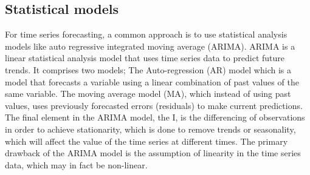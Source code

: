 \subsection{Statistical models}
For time series forecasting, a common approach is to use statistical analysis models like auto regressive integrated moving average (ARIMA).
ARIMA is a linear statistical analysis model that uses time series data to predict future trends. It comprises two models; The Auto-regression (AR) model which is a model that forecasts a variable using a linear combination of past values of the same variable. The moving average model (MA), which instead of using past values, uses previously forecasted errors (residuals) to make current predictions. 
The final element in the ARIMA model, the I, is the differencing of observations in order to achieve stationarity, which is done to remove trends or seasonality, which will affect the value of the time series at different times. The primary drawback of the ARIMA model is the assumption of linearity in the time series data, which may in fact be non-linear.\cite{HybridArimaAndNN}\cite{ForecastinPrinciplesAndPractice}
